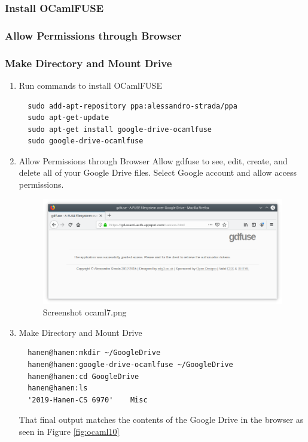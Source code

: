 \subsubsection{Install OCamlFUSE}
\subsubsection{Allow Permissions through Browser }
\subsubsection{Make Directory and Mount Drive}
\begin{enumerate}
\item Run commands to install OCamlFUSE
\begin{verbatim}
  sudo add-apt-repository ppa:alessandro-strada/ppa
  sudo apt-get-update
  sudo apt-get install google-drive-ocamlfuse
  sudo google-drive-ocamlfuse
\end{verbatim}
\item Allow Permissions through Browser 
  Allow gdfuse to see, edit, create, and delete all of your Google Drive files. 
  Select Google account and allow access permissions.
  \begin{figure}[htb]
    \centering
    \includegraphics[scale=0.47]{images/ocaml7.png}
    \caption{Screenshot ocaml7.png}        %
    \label{fig:ocaml7}
  \end{figure}
\item Make Directory and Mount Drive
\begin{verbatim}
  hanen@hanen:mkdir ~/GoogleDrive
  hanen@hanen:google-drive-ocamlfuse ~/GoogleDrive
  hanen@hanen:cd GoogleDrive
  hanen@hanen:ls
  '2019-Hanen-CS 6970'    Misc
\end{verbatim}
That final output matches the contents of the Google Drive in the
browser as seen in Figure \ref{fig:ocaml10}
\begin{figure}[htb]
  \centering

\end{figure}
\end{enumerate}
